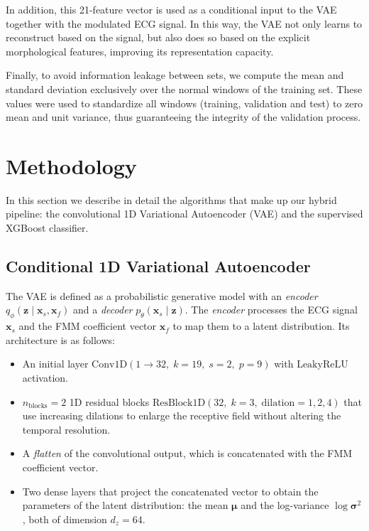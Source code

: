 \documentclass[11pt]{article}
\begin{document}
\newpage


In addition, this 21-feature vector is used as a conditional input to the VAE together with the modulated ECG signal. In this way, the VAE not only learns to reconstruct based on the signal, but also does so based on the explicit morphological features, improving its representation capacity.

Finally, to avoid information leakage between sets, we compute the mean and standard deviation exclusively over the normal windows of the training set. These values were used to standardize all windows (training, validation and test) to zero mean and unit variance, thus guaranteeing the integrity of the validation process.



\section{Methodology}

In this section we describe in detail the algorithms that make up our hybrid pipeline: the convolutional 1D Variational Autoencoder (VAE) and the supervised XGBoost classifier.


\subsection{Conditional 1D Variational Autoencoder}

The VAE is defined as a probabilistic generative model with an \textit{encoder}
\(
q_\phi(\mathbf{z} \mid \mathbf{x}_s, \mathbf{x}_f)
\)
and a \textit{decoder}
\(
p_\theta(\mathbf{x}_s \mid \mathbf{z}).
\)
The \textit{encoder} processes the ECG signal $\mathbf{x}_s$ and the FMM coefficient vector $\mathbf{x}_f$ to map them to a latent distribution. Its architecture is as follows:
\vspace{-0.2em}
\begin{itemize}
    \item An initial layer $\mathrm{Conv1D}(1\to32,\; k=19,\; s=2,\; p=9)$ with $\mathrm{LeakyReLU}$ activation.
    \vspace{-0.2em}
    \item $n_{\mathrm{blocks}}=2$ 1D residual blocks
    \(
       \mathrm{ResBlock1D}(32,\; k=3,\; \mathrm{dilation} = 1,2,4)
    \)
    that use increasing dilations to enlarge the receptive field without altering the temporal resolution.
    \vspace{-0.2em}
    \item A \textit{flatten} of the convolutional output, which is concatenated with the FMM coefficient vector. %
    \vspace{-0.2em}
   \item Two dense layers that project the concatenated vector to obtain the parameters of the latent distribution: the mean $\boldsymbol{\mu}$ and the log-variance $\log\boldsymbol{\sigma}^2$, both of dimension $d_z=64$.
\end{itemize}
\end{document}

